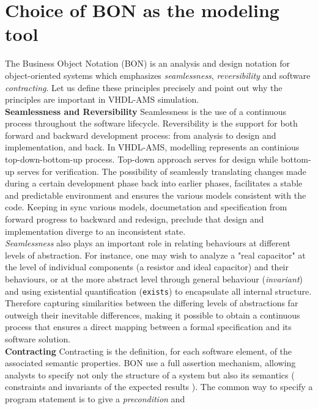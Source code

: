 \documentclass{article}
\newcommand{\inv}{\emph{invariant}\xspace}
\begin{document}
\section{Choice of BON as the modeling tool}
\label{sec:choiceobon}
The Business Object Notation (BON) is an analysis and design notation
for object-oriented systems  which emphasizes \emph{seamlessness},\xspace
\emph{reversibility} and software \emph{contracting}.
Let us define these principles precisely and point out why the principles
are important in VHDL-AMS simulation.\\
\textbf{Seamlessness and  Reversibility} \xspace \xspace
Seamlessness is the use of a continuous process
throughout the software lifecycle. Reversibility is the support for
both forward and backward development process: from analysis to design
and implementation, and back.
In VHDL-AMS, modelling represents an continious top-down-bottom-up
process. Top-down approach serves for design while bottom-up
serves for verification. The possibility of seamlessly translating
changes made during a certain development phase back into earlier phases,
facilitates a stable and predictable environment and ensures the various
models consistent with the code. Keeping in sync various models, documetation
and specification from forward progress to backward and redesign, preclude
that design and implementation diverge to an inconsistent state.\\
\emph{Seamlessness} also plays an important role in relating behaviours at
different levels of abstraction. For instance, one may wish to analyze
a "real capacitor" at the level of individual components (a resistor and
ideal capacitor) and their behaviours, or at the more abstract level through
general behaviour (\inv) and using existential quantification (\texttt{exists})
to encapsulate all internal structure. Therefore capturing similarities between
the differing levels of abstractions far outweigh their inevitable differences,
making it possible to obtain a continuous process that ensures a direct mapping
between a formal specification and its software solution.\\
\textbf{Contracting} \xspace \xspace Contracting is the definition, for each
software element, of the associated semantic properties. BON use a full
assertion mechanism, allowing analysts to specify not only the structure of
a system but also its semantics ( constraints and invariants of the expected results ).
The common way to specify a program statement is to give a \emph{precondition} and
\end{document}
